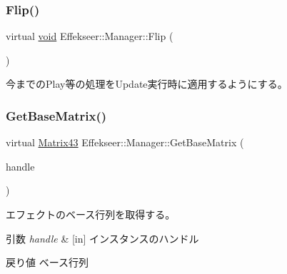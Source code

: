 \subsubsection{\texorpdfstring{Flip()}{Flip()}}
{\footnotesize\ttfamily virtual \mbox{\hyperlink{namespace_effekseer_ab34c4088e512200cf4c2716f168deb56}{void}} Effekseer\+::\+Manager\+::\+Flip (\begin{DoxyParamCaption}{ }\end{DoxyParamCaption})\hspace{0.3cm}{\ttfamily [pure virtual]}}



今までの\+Play等の処理を\+Update実行時に適用するようにする。 

\mbox{\label{class_effekseer_1_1_manager_a095085007e1df5de623fea1a96c31a04}} 
\subsubsection{\texorpdfstring{Get\+Base\+Matrix()}{GetBaseMatrix()}}
{\footnotesize\ttfamily virtual \mbox{\hyperlink{struct_effekseer_1_1_matrix43}{Matrix43}} Effekseer\+::\+Manager\+::\+Get\+Base\+Matrix (\begin{DoxyParamCaption}\item[{\mbox{\hyperlink{namespace_effekseer_afba58b8d812da862190e9bbfc040824a}{Handle}}}]{handle }\end{DoxyParamCaption})\hspace{0.3cm}{\ttfamily [pure virtual]}}



エフェクトのベース行列を取得する。 


\begin{DoxyParams}{引数}
{\em handle} & \mbox{[}in\mbox{]} インスタンスのハンドル \\
\hline
\end{DoxyParams}
\begin{DoxyReturn}{戻り値}
ベース行列 
\end{DoxyReturn}
\mbox{\label{class_effekseer_1_1_manager_a10a79ead8392a39a9f43e771c7de067c}} 
